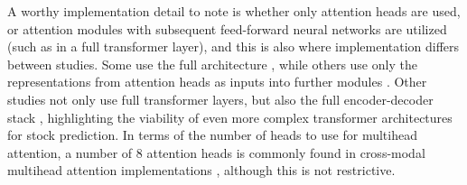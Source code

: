 \documentclass[stu,floatsintext]{apa7}
\begin{document}
A worthy implementation detail to note is whether only attention heads are used, or attention modules with subsequent feed-forward neural networks are utilized (such as in a full transformer layer), and this is also where implementation differs between studies. Some use the full architecture \parencite{dashtaki2025hsif,fataliyev2023mcasp,mandal2023enhancing}, while others use only the representations from attention heads as inputs into further modules \parencite{albada2025predicting,jang2025selective}. Other studies not only use full transformer layers, but also the full encoder-decoder stack \parencite{albada2025predicting,xu2025hrformer}, highlighting the viability of even more complex transformer architectures for stock prediction. In terms of the number of heads to use for multihead attention, a number of $8$ attention heads is commonly found in cross-modal multihead attention implementations \parencite{chen2026newsdriven,jang2025selective}, although this is not restrictive.
\end{document}
